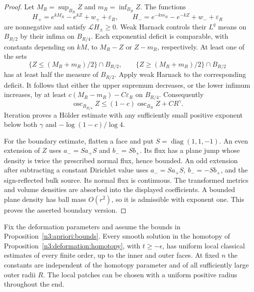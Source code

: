 \begin{proof}
Let $M_R=\sup_{B_R}Z$ and $m_R=\inf_{B_R}Z$.  The functions
\begin{equation}\label{n3:existence:exponential-deficits}
 H_+=e^{kM_R}-e^{kZ}+w_++\varepsilon_R,
 \qquad
 H_-=e^{-km_R}-e^{-kZ}+w_-+\varepsilon_R
\end{equation}
are nonnegative and satisfy $\mathcal L H_\pm\ge0$.
Weak Harnack controls their $L^q$ means on $B_{R/2}$ by their
infima on $B_{R/4}$.  Each exponential deficit is comparable,
with constants depending on $kM$, to $M_R-Z$ or $Z-m_R$,
respectively.  At least one of the sets
\[
 \{Z\le(M_R+m_R)/2\}\cap B_{R/2},\qquad
 \{Z\ge(M_R+m_R)/2\}\cap B_{R/2}
\]
has at least half the measure of $B_{R/2}$.  Apply weak Harnack to
the corresponding deficit.  It follows that either the upper
supremum decreases, or the lower infimum increases, by at least
$c(M_R-m_R)-C\varepsilon_R$ on $B_{R/4}$.  Consequently
\begin{equation}\label{n3:existence:oscillation-contraction}
 \operatorname{osc}_{B_{R/4}}Z
 \le(1-c)\operatorname{osc}_{B_R}Z+CR^\gamma.
\end{equation}
Iteration proves a H\"older estimate with any sufficiently small
positive exponent below both $\gamma$ and
$-\log(1-c)/\log4$.

For the boundary estimate, flatten a face and put
$S=\operatorname{diag}(1,1,-1)$.  An even extension of $Z$ uses
$a_-=Sa_+S$ and $b_-=Sb_+$.  Its flux has a plane jump whose
density is twice the prescribed normal flux, hence bounded.
An odd extension after subtracting a constant Dirichlet value uses
$a_-=Sa_+S$, $b_-=-Sb_+$, and the sign-reflected bulk source.
Its normal flux is continuous.  The transformed metrics and volume
densities are absorbed into the displayed coefficients.  A bounded
plane density has ball mass $O(r^2)$, so it is admissible with
exponent one.  This proves the asserted boundary version.
\end{proof}


\begin{proposition}
\label{n3:existence:classical-bounds}
Fix the deformation parameters and assume the bounds in
Proposition~\ref{n3:apriori:bounds}.  Every smooth solution in the
homotopy of Proposition~\ref{n3:deformation:homotopy}, with
$t\ge-\epsilon$, has uniform local classical estimates of every
finite order, up to the inner and outer faces.  At fixed $n$ the
constants are independent of the homotopy parameter and of all
sufficiently large outer radii $R$.  The local patches can be chosen
with a uniform positive radius throughout the end.
\end{proposition}

